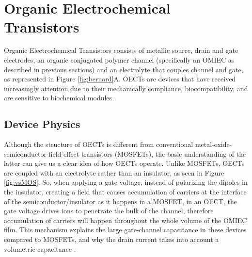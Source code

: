 
\section{Organic Electrochemical Transistors} \label{sec:OECTs}

Organic Electrochemical Transistors consists of metallic source, drain and gate electrodes, an organic conjugated polymer channel (specifically an OMIEC as described in previous sections) and an electrolyte that couples channel and gate, as represented in Figure \ref{fig:bernard}A. OECTs are devices that have received increasingly attention due to their mechanically compliance, biocompatibility, and are sensitive to biochemical modules \cite{tanMixedIonicElectronic2022}. 



\subsection{Device Physics} \label{subsec:devphy}

Although the structure of OECTs is different from conventional metal-oxide-semiconductor field-effect transistors (MOSFETs), the basic understanding of the latter can give us a clear idea of how OECTs operate. Unlike MOSFETs, OECTs are coupled with an electrolyte rather than an insulator, as seen in Figure \ref{fig:vsMOS}. So, when applying a gate voltage, instead of polarizing the dipoles in the insulator, creating a field that causes accumulation of carriers at the interface of the semiconductor/insulator as it happens in a MOSFET, in an OECT, the gate voltage drives ions to penetrate the bulk of the channel, therefore accumulation of carriers will happen throughout the whole volume of the OMIEC film. This mechanism explains the large gate-channel capacitance in these devices compared to MOSFETs, and why the drain current takes into account a volumetric capacitance \cite{friedleinDevicePhysicsOrganic2018}.


